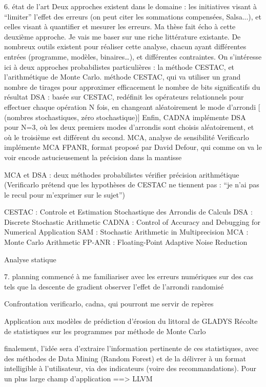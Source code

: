 \documentclass[a4paper,11pt]{report}
\begin{document}
6. état de l’art
Deux approches existent dans le domaine : les initiatives visant à “limiter” l’effet des erreurs (on peut citer les sommations compensées, Salsa...), et celles visant à quantifier et mesurer les erreurs.
Ma thèse fait écho à cette deuxième approche.
Je vais me baser sur une riche littérature existante.
De nombreux outils existent pour réaliser cette analyse, chacun ayant différentes entrées (programme, modèles, binaires…), et différentes contraintes.
On s’intéresse ici à deux approches probabilistes particulières : la méthode CESTAC, et l’arithmétique de Monte Carlo.
méthode CESTAC, qui va utiliser un grand nombre de tirages pour approximer efficacement le nombre de bits significatifs du résultat
DSA : basée sur CESTAC, redéfinit les opérateurs relationnels pour effectuer chaque opération N fois, en changeant aléatoirement le mode d’arrondi [ (nombres stochastiques, zéro stochastique)] 
Enfin, CADNA implémente DSA pour N=3, où les deux premiers modes d’arrondis sont choisis aléatoirement, et où le troisième est différent du second.
MCA, analyse de sensibilité
Verificarlo implémente MCA
FPANR, format proposé par David Defour, qui comme on va le voir encode astucieusement la précision dans la mantisse

MCA et DSA : deux méthodes probabilistes vérifier précision arithmétique
(Verificarlo prétend que les hypothèses de CESTAC ne tiennent pas : “je n’ai pas le recul pour m’exprimer sur le sujet”)

CESTAC : Controle et Estimation Stochastique des Arrondis de Calculs
DSA : Discrete Stochastic Arithmetic
CADNA : Control of Accuracy and Debugging for Numerical Application
SAM : Stochastic Arithmetic in Multiprecision
MCA : Monte Carlo Arithmetic
FP-ANR : Floating-Point Adaptive Noise Reduction

Analyse statique

7. planning
commencé à me familiariser avec les erreurs numériques sur des cas tels que la descente de gradient
observer l’effet de l’arrondi randomisé

Confrontation
verificarlo, cadna, qui pourront me servir de repères

Application aux modèles de prédiction d’érosion du littoral de GLADYS
Récolte de statistiques sur les programmes par méthode de Monte Carlo

finalement, l’idée sera d’extraire l’information pertinente de ces statistiques, avec des méthodes de Data Mining (Random Forest)
et de la délivrer à un format intelligible à l’utilisateur, via des indicateurs (voire des recommandations).
Pour un plus large champ d’application  ==> LLVM
\end{document}
